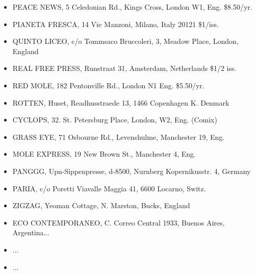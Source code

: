 \documentclass[11pt,twoside,a4paper]{book}
\begin{document}
\begin{minipage}[t]{0.20\textwidth}
\begin{scriptsize}
\begin{itemize}
	\item[] PEACE NEWS, 5 Celedonian Rd., Kings Cross, London W1, Eng.	\$8.50/yr.
	\item[] PIANETA FRESCA, 14 Vie Manzoni, Milano, Italy 20121 \$1/iss. 
	\item[] QUINTO LICEO, c/o Tommsaco Bruccoleri, 3, Meadow Place,	London, England 
	\item[] REAL FREE PRESS, Runstraat 31, Amsterdam, Netherlands \$1/2 iss. 
	\item[] RED MOLE, 182 Pentonville Rd., London N1 Eng. \$5.50/yr. 
	\item[] ROTTEN, Huset, Readhusstraede 13, 1466 Copenhagen K. Denmark
 	\item[] CYCLOPS, 32. St. Petersburg Place, London, W2, Eng. (Comix) 
	\item[] GRASS EYE, 71 Osbourne Rd., Levenshulme, Manchester 19, Eng. 
	\item[] MOLE EXPRESS, 19 New Brown St., Manchester 4, Eng. 
	\item[] PANGGG, Upn-Sippenpresse, d-8500, Nurnberg Kopernikusstr. 4, Germany \item[] PARIA, c/o 	Poretti Viavalle Maggia 41, 6600 Locarno, Switz. 
	\item[] ZIGZAG, Yeoman Cottage, N. Marston, Bucks, England
	\item[] ECO CONTEMPORANEO, C. Correo Central 1933, Buenos Aires, Argentina... 
\end{itemize}
\end{scriptsize}
\end{minipage}\hfill
\begin{minipage}[t]{0.20\textwidth}
\begin{scriptsize}
\begin{itemize}
	\item[] ...
\end{itemize}
\end{scriptsize}
\end{minipage}\hfill
\begin{minipage}[t]{0.20\textwidth}
\begin{scriptsize}
\begin{itemize}
	\item[] ...
\end{itemize}
\end{scriptsize}
\end{minipage}\hfill
\end{document}
